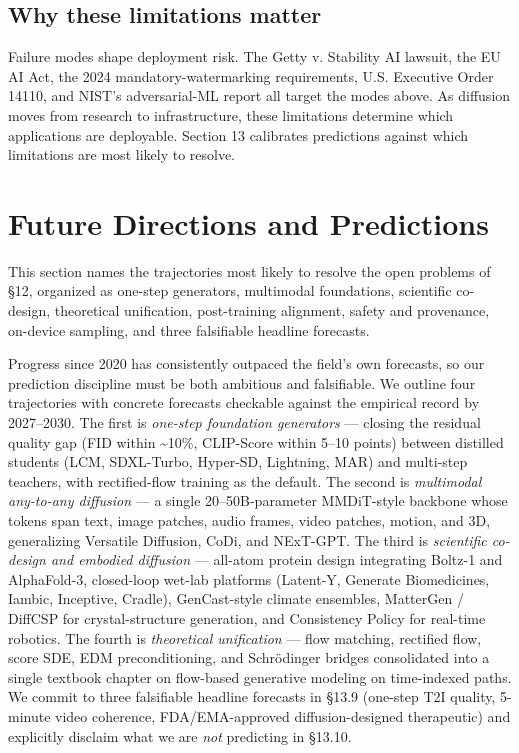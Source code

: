 \documentclass{article}
\begin{document}
\subsection{Why these limitations matter}\label{why-these-limitations-matter}

Failure modes shape deployment risk. The Getty v. Stability AI lawsuit, the EU AI Act, the 2024 mandatory-watermarking requirements, U.S. Executive Order 14110, and NIST's adversarial-ML report \citep{vassilev20242024} all target the modes above. As diffusion moves from research to infrastructure, these limitations determine which applications are deployable. Section 13 calibrates predictions against which limitations are most likely to resolve.

\section{Future Directions and Predictions}\label{future-directions-and-predictions}

This section names the trajectories most likely to resolve the open problems of §12, organized as one-step generators, multimodal foundations, scientific co-design, theoretical unification, post-training alignment, safety and provenance, on-device sampling, and three falsifiable headline forecasts.

Progress since 2020 has consistently outpaced the field's own forecasts, so our prediction discipline must be both ambitious and falsifiable. We outline four trajectories with concrete forecasts checkable against the empirical record by 2027--2030. The first is \emph{one-step foundation generators} --- closing the residual quality gap (FID within \textasciitilde10\%, CLIP-Score within 5--10 points) between distilled students (LCM, SDXL-Turbo, Hyper-SD, Lightning, MAR) and multi-step teachers, with rectified-flow training as the default. The second is \emph{multimodal any-to-any diffusion} --- a single 20--50B-parameter MMDiT-style backbone whose tokens span text, image patches, audio frames, video patches, motion, and 3D, generalizing Versatile Diffusion, CoDi, and NExT-GPT. The third is \emph{scientific co-design and embodied diffusion} --- all-atom protein design integrating Boltz-1 and AlphaFold-3, closed-loop wet-lab platforms (Latent-Y, Generate Biomedicines, Iambic, Inceptive, Cradle), GenCast-style climate ensembles, MatterGen / DiffCSP for crystal-structure generation, and Consistency Policy for real-time robotics. The fourth is \emph{theoretical unification} --- flow matching, rectified flow, score SDE, EDM preconditioning, and Schrödinger bridges consolidated into a single textbook chapter on flow-based generative modeling on time-indexed paths. We commit to three falsifiable headline forecasts in §13.9 (one-step T2I quality, 5-minute video coherence, FDA/EMA-approved diffusion-designed therapeutic) and explicitly disclaim what we are \emph{not} predicting in §13.10.
\end{document}
